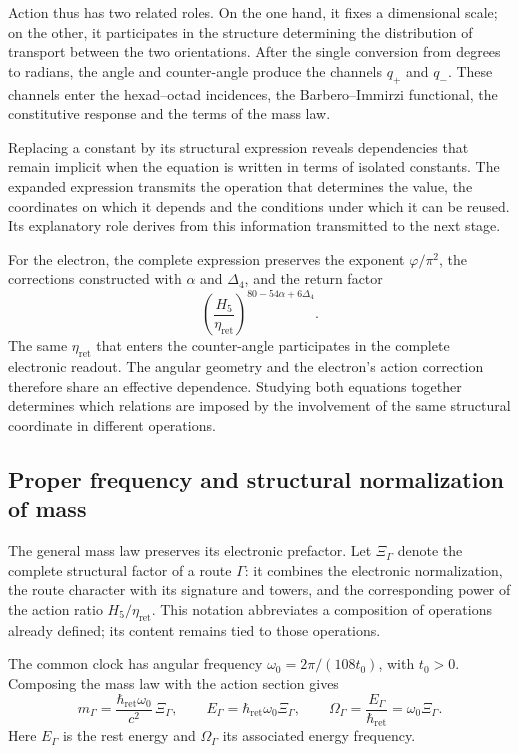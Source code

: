 Action thus has two related roles. On the one hand, it fixes a
dimensional scale; on the other, it participates in the structure determining the
distribution of transport between the two orientations. After the single
conversion from degrees to radians, the angle and counter-angle produce the channels
$q_+$ and $q_-$. These channels enter the hexad--octad incidences,
the Barbero--Immirzi functional, the constitutive response and the
terms of the mass law.

Replacing a constant by its structural expression reveals
dependencies that remain implicit when the equation is written in terms of
isolated constants. The expanded expression transmits the operation that
determines the value, the coordinates on which it depends and the conditions
under which it can be reused. Its explanatory role derives from this
information transmitted to the next stage.

For the electron, the complete expression preserves the exponent
$\varphi/\pi^2$, the corrections constructed with $\alpha$ and $\Delta_4$,
and the return factor
\begin{equation}
 \left(\frac{H_5}{\eta_{\mathrm{ret}}}\right)^{80-54\alpha+6\Delta_4}.
 \label{eq:narrativa-factor-electronico}
\end{equation}
The same $\eta_{\mathrm{ret}}$ that enters the counter-angle participates
in the complete electronic readout. The angular geometry and the electron's
action correction therefore share an effective dependence.
Studying both equations together determines which relations
are imposed by the involvement of the same structural coordinate
in different operations.

\subsection{Proper frequency and structural normalization of mass}
\label{subsec:narrativa-masa-frecuencia}

The general mass law preserves its electronic prefactor. Let
$\Xi_\Gamma$ denote the complete structural factor of a route $\Gamma$: it combines the
electronic normalization, the route character with its signature and towers,
and the corresponding power of the action ratio
$H_5/\eta_{\mathrm{ret}}$. This notation abbreviates a composition of
operations already defined; its content remains tied to those operations.

The common clock has angular frequency
$\omega_0=2\pi/(108t_0)$, with $t_0>0$. Composing the mass law with the action
section gives
\begin{equation}
 \boxed{
 m_\Gamma=\frac{\hbar_{\mathrm{ret}}\omega_0}{c^2}\,\Xi_\Gamma,
 \qquad
 E_\Gamma=\hbar_{\mathrm{ret}}\omega_0\Xi_\Gamma,
 \qquad
 \Omega_\Gamma=\frac{E_\Gamma}{\hbar_{\mathrm{ret}}}
             =\omega_0\Xi_\Gamma.}
 \label{eq:narrativa-masa-energia-frecuencia}
\end{equation}
Here $E_\Gamma$ is the rest energy and $\Omega_\Gamma$ its associated
energy frequency.

